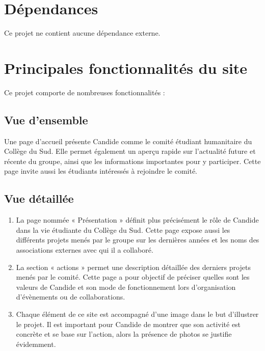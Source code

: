 \documentclass[a4,10pt,french]{sphinxmanual}
\begin{document}
\section{Dépendances}
\label{\detokenize{chapitre-01:dependances}}
\sphinxAtStartPar
Ce projet ne contient aucune dépendance externe.


\section{Principales fonctionnalités du site}
\label{\detokenize{chapitre-01:principales-fonctionnalites-du-site}}
\sphinxAtStartPar
Ce projet comporte de nombreuses fonctionnalités :


\subsection{Vue d’ensemble}
\label{\detokenize{chapitre-01:vue-densemble}}
\sphinxAtStartPar
Une page d’accueil présente Candide comme le comité étudiant humanitaire du Collège du Sud. Elle permet également un aperçu rapide sur l’actualité future et récente du groupe, ainsi que les informations importantes pour y participer. Cette page invite aussi les étudiants intéressés à rejoindre le comité.


\subsection{Vue détaillée}
\label{\detokenize{chapitre-01:vue-detaillee}}\begin{enumerate}
%
\item {} 
\sphinxAtStartPar
La page nommée « Présentation » définit plus précisément le rôle de Candide dans la vie étudiante du Collège du Sud. Cette page expose aussi les différents projets menés par le groupe sur les dernières années et les noms des associations externes avec qui il a collaboré.

\item {} 
\sphinxAtStartPar
La section « actions » permet une description détaillée des derniers projets menés par le comité. Cette page a pour objectif de préciser quelles sont les valeurs de Candide et son mode de fonctionnement lors d’organisation d’évènements ou de collaborations.

\item {} 
\sphinxAtStartPar
Chaque élément de ce site est accompagné d’une image dans le but d’illustrer le projet. Il est important pour Candide de montrer que son activité est concrète et se base sur l’action, alors la présence de photos se justifie évidemment.

\end{enumerate}
\end{document}

